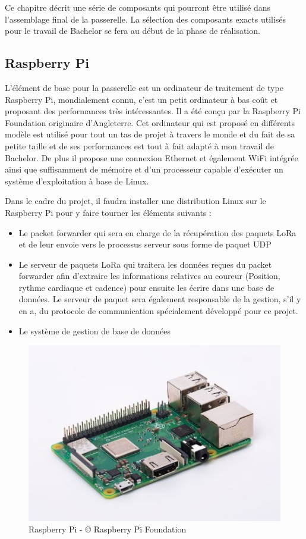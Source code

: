 Ce chapitre décrit une série de composants qui pourront être utilisé dans l’assemblage final de la passerelle. La sélection des composants exacts utilisés pour le travail de Bachelor se fera au début de la phase de réalisation.

\subsection{Raspberry Pi}

L’élément de base pour la passerelle est un ordinateur de traitement de type Raspberry Pi, mondialement connu, c’est un petit ordinateur à bas coût et proposant des performances très intéressantes. Il a été conçu par la Raspberry Pi Foundation originaire d’Angleterre. Cet ordinateur qui est proposé en différents modèle est utilisé pour tout un tas de projet à travers le monde et du fait de sa petite taille et de ses performances est tout à fait adapté à mon travail de Bachelor. De plus il propose une connexion Ethernet et également WiFi intégrée ainsi que suffisamment de mémoire et d’un processeur capable d’exécuter un système d’exploitation à base de Linux.

Dans le cadre du projet, il faudra installer une distribution Linux sur le Raspberry Pi pour y faire tourner les éléments suivants :

\begin{itemize}
\item Le packet forwarder qui sera en charge de la récupération des paquets LoRa et de leur envoie vers le processus serveur sous forme de paquet UDP
\item Le serveur de paquets LoRa qui traitera les données reçues du packet forwarder afin d’extraire les informations relatives au coureur (Position, rythme cardiaque et cadence) pour ensuite les écrire dans une base de données. Le serveur de paquet sera également responsable de la gestion, s’il y en a, du protocole de communication spécialement développé pour ce projet.
\item Le système de gestion de base de données
\end{itemize}

\begin{figure}[htb]
\centering 
\includegraphics[width=0.5\columnwidth]{../images/RaspberryPi.jpg} 
\caption[Raspberry Pi]{Raspberry Pi - © Raspberry Pi Foundation}
\label{fig:rpi}
\end{figure}

